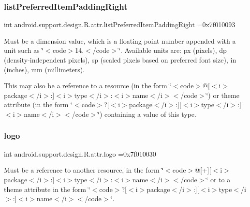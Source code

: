 \subsubsection{\texorpdfstring{list\+Preferred\+Item\+Padding\+Right}{listPreferredItemPaddingRight}}
{\footnotesize\ttfamily int android.\+support.\+design.\+R.\+attr.\+list\+Preferred\+Item\+Padding\+Right =0x7f010093\hspace{0.3cm}{\ttfamily [static]}}

Must be a dimension value, which is a floating point number appended with a unit such as \char`\"{}$<$code$>$14.\+5sp$<$/code$>$\char`\"{}. Available units are\+: px (pixels), dp (density-\/independent pixels), sp (scaled pixels based on preferred font size), in (inches), mm (millimeters). 

This may also be a reference to a resource (in the form \char`\"{}$<$code$>$@\mbox{[}$<$i$>$package$<$/i$>$\+:\mbox{]}$<$i$>$type$<$/i$>$\+:$<$i$>$name$<$/i$>$$<$/code$>$\char`\"{}) or theme attribute (in the form \char`\"{}$<$code$>$?\mbox{[}$<$i$>$package$<$/i$>$\+:\mbox{]}\mbox{[}$<$i$>$type$<$/i$>$\+:\mbox{]}$<$i$>$name$<$/i$>$$<$/code$>$\char`\"{}) containing a value of this type. \mbox{\label{classandroid_1_1support_1_1design_1_1R_1_1attr_a71cd4cca1c1a2d4a719434831f5e0c6d}} 
\subsubsection{\texorpdfstring{logo}{logo}}
{\footnotesize\ttfamily int android.\+support.\+design.\+R.\+attr.\+logo =0x7f010030\hspace{0.3cm}{\ttfamily [static]}}

Must be a reference to another resource, in the form \char`\"{}$<$code$>$@\mbox{[}+\mbox{]}\mbox{[}$<$i$>$package$<$/i$>$\+:\mbox{]}$<$i$>$type$<$/i$>$\+:$<$i$>$name$<$/i$>$$<$/code$>$\char`\"{} or to a theme attribute in the form \char`\"{}$<$code$>$?\mbox{[}$<$i$>$package$<$/i$>$\+:\mbox{]}\mbox{[}$<$i$>$type$<$/i$>$\+:\mbox{]}$<$i$>$name$<$/i$>$$<$/code$>$\char`\"{}. \mbox{\label{classandroid_1_1support_1_1design_1_1R_1_1attr_a907be73d8821c072ce87eae8264bbe50}} 
